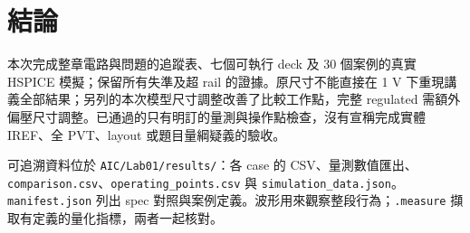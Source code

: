 \section{結論}
本次完成整章電路與問題的追蹤表、七個可執行 deck 及 30 個案例的真實 HSPICE 模擬；保留所有失準及超 rail 的證據。原尺寸不能直接在 1 V 下重現講義全部結果；另列的本次模型尺寸調整改善了比較工作點，完整 regulated 需額外偏壓尺寸調整。已通過的只有明訂的量測與操作點檢查，沒有宣稱完成實體 IREF、全 PVT、layout 或題目量綱疑義的驗收。

可追溯資料位於 \texttt{AIC/Lab01/results/}：各 case 的 CSV、量測數值匯出、\texttt{comparison.csv}、\texttt{operating\_points.csv} 與 \texttt{simulation\_data.json}。\texttt{manifest.json} 列出 spec 對照與案例定義。波形用來觀察整段行為；\texttt{.measure} 擷取有定義的量化指標，兩者一起核對。
